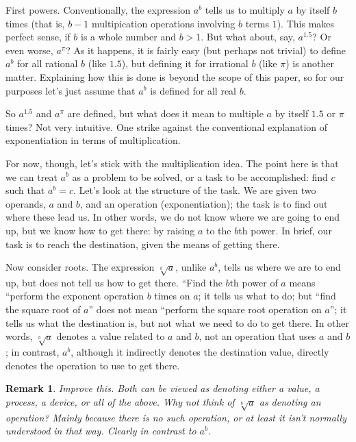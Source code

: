 \documentclass[reqno,12pt]{tufte-book}
\numberwithin{equation}{subsection}
\newtheorem{remark}{Remark}
\begin{document}
First powers.  Conventionally, the expression $a^b$ tells us to
multiply $a$ by itself $b$ times (that is, $b-1$ multipication
operations involving $b$ terms $1$).  This makes perfect sense, if $b$
is a whole number and $b>1$.  But what about, say, $a^{1.5}$?  Or even
worse, $a^\pi$?  As it happens, it is fairly easy (but perhaps not
trivial) to define $a^b$ for all rational $b$ (like $1.5$), but
defining it for irrational $b$ (like $\pi$) is another matter.
Explaining how this is done is beyond the scope of this paper, so for
our purposes let's just assume that $a^b$ is defined for all real $b$.

So $a^{1.5}$ and $a^\pi$ are defined, but what does it mean to
multiple $a$ by itself $1.5$ or $\pi$ times?  Not very intuitive.  One
strike against the conventional explanation of exponentiation in terms
of multiplication.

For now, though, let's stick with the multiplication idea. The point
here is that we can treat $a^b$ as a problem to be solved, or a task
to be accomplished: find $c$ such that $a^b = c$.  Let's look at the
structure of the task.  We are given two operands, $a$ and $b$, and an
operation (exponentiation); the task is to find out where these lead
us.  In other words, we do not know where we are going to end up, but
we know how to get there: by raising $a$ to the $b$th power.  In
brief, our task is to reach the destination, given the means of
getting there.

Now consider roots.  The expression $\sqrt[b]{a}$, unlike $a^b$, tells
us where we are to end up, but does not tell us how to get there.
``Find the $b$th power of $a$ means ``perform the exponent operation
$b$ times on $a$; it tells us what to do; but ``find the square root
of $a$'' does not mean ``perform the square root operation on $a$'';
it tells us what the destination is, but not what we need to do to get
there.  In other words, $\sqrt[b]{a}$ denotes a value related to $a$
and $b$, not an operation that uses $a$ and $b$; in contrast, $a^b$,
although it indirectly denotes the destination value, directly denotes
the operation to use to get there.

\begin{remark}
  Improve this.  Both can be viewed as denoting either a value, a
  process, a device, or all of the above.  Why not think of
  $\sqrt[b]{a}$ as denoting an operation?  Mainly because there is no
  such operation, or at least it isn't normally understood in that
  way.  Clearly in contrast to $a^b$.
\end{remark}
\end{document}
